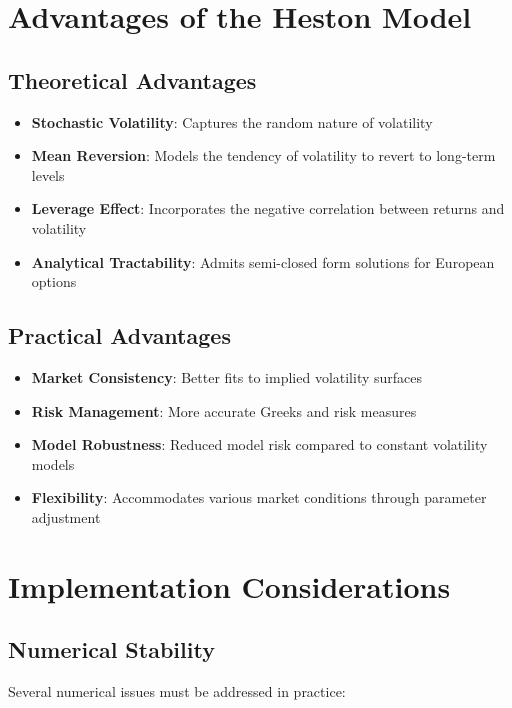 \documentclass[12pt,a4paper]{article}
\begin{document}
\section{Advantages of the Heston Model}

\subsection{Theoretical Advantages}

\begin{itemize}
    \item \textbf{Stochastic Volatility}: Captures the random nature of volatility
    \item \textbf{Mean Reversion}: Models the tendency of volatility to revert to long-term levels
    \item \textbf{Leverage Effect}: Incorporates the negative correlation between returns and volatility
    \item \textbf{Analytical Tractability}: Admits semi-closed form solutions for European options
\end{itemize}

\subsection{Practical Advantages}

\begin{itemize}
    \item \textbf{Market Consistency}: Better fits to implied volatility surfaces
    \item \textbf{Risk Management}: More accurate Greeks and risk measures
    \item \textbf{Model Robustness}: Reduced model risk compared to constant volatility models
    \item \textbf{Flexibility}: Accommodates various market conditions through parameter adjustment
\end{itemize}

\section{Implementation Considerations}

\subsection{Numerical Stability}

Several numerical issues must be addressed in practice:
\end{document}
